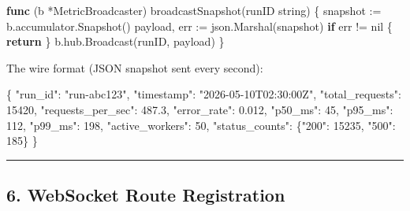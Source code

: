 \documentclass[
]{article}
\newenvironment{Shaded}{}{}
\newcommand{\ControlFlowTok}[1]{\textcolor[rgb]{0.00,0.44,0.13}{\textbf{#1}}}
\newcommand{\DataTypeTok}[1]{\textcolor[rgb]{0.56,0.13,0.00}{#1}}
\newcommand{\DecValTok}[1]{\textcolor[rgb]{0.25,0.63,0.44}{#1}}
\newcommand{\FloatTok}[1]{\textcolor[rgb]{0.25,0.63,0.44}{#1}}
\newcommand{\FunctionTok}[1]{\textcolor[rgb]{0.02,0.16,0.49}{#1}}
\newcommand{\KeywordTok}[1]{\textcolor[rgb]{0.00,0.44,0.13}{\textbf{#1}}}
\newcommand{\NormalTok}[1]{#1}
\newcommand{\OperatorTok}[1]{\textcolor[rgb]{0.40,0.40,0.40}{#1}}
\newcommand{\OtherTok}[1]{\textcolor[rgb]{0.00,0.44,0.13}{#1}}
\newcommand{\StringTok}[1]{\textcolor[rgb]{0.25,0.44,0.63}{#1}}
\begin{document}
\begin{Shaded}
\begin{Highlighting}[]
\KeywordTok{func} \OperatorTok{(}\NormalTok{b }\OperatorTok{*}\NormalTok{MetricBroadcaster}\OperatorTok{)}\NormalTok{ broadcastSnapshot}\OperatorTok{(}\NormalTok{runID }\DataTypeTok{string}\OperatorTok{)} \OperatorTok{\{}
\NormalTok{    snapshot }\OperatorTok{:=}\NormalTok{ b}\OperatorTok{.}\NormalTok{accumulator}\OperatorTok{.}\NormalTok{Snapshot}\OperatorTok{()}
\NormalTok{    payload}\OperatorTok{,}\NormalTok{ err }\OperatorTok{:=}\NormalTok{ json}\OperatorTok{.}\NormalTok{Marshal}\OperatorTok{(}\NormalTok{snapshot}\OperatorTok{)}
    \ControlFlowTok{if}\NormalTok{ err }\OperatorTok{!=} \OtherTok{nil} \OperatorTok{\{}
        \ControlFlowTok{return}
    \OperatorTok{\}}
\NormalTok{    b}\OperatorTok{.}\NormalTok{hub}\OperatorTok{.}\NormalTok{Broadcast}\OperatorTok{(}\NormalTok{runID}\OperatorTok{,}\NormalTok{ payload}\OperatorTok{)}
\OperatorTok{\}}
\end{Highlighting}
\end{Shaded}

The wire format (JSON snapshot sent every second):

\begin{Shaded}
\begin{Highlighting}[]
\FunctionTok{\{}
  \DataTypeTok{"run\_id"}\FunctionTok{:} \StringTok{"run{-}abc123"}\FunctionTok{,}
  \DataTypeTok{"timestamp"}\FunctionTok{:} \StringTok{"2026{-}05{-}10T02:30:00Z"}\FunctionTok{,}
  \DataTypeTok{"total\_requests"}\FunctionTok{:} \DecValTok{15420}\FunctionTok{,}
  \DataTypeTok{"requests\_per\_sec"}\FunctionTok{:} \FloatTok{487.3}\FunctionTok{,}
  \DataTypeTok{"error\_rate"}\FunctionTok{:} \FloatTok{0.012}\FunctionTok{,}
  \DataTypeTok{"p50\_ms"}\FunctionTok{:} \DecValTok{45}\FunctionTok{,}
  \DataTypeTok{"p95\_ms"}\FunctionTok{:} \DecValTok{112}\FunctionTok{,}
  \DataTypeTok{"p99\_ms"}\FunctionTok{:} \DecValTok{198}\FunctionTok{,}
  \DataTypeTok{"active\_workers"}\FunctionTok{:} \DecValTok{50}\FunctionTok{,}
  \DataTypeTok{"status\_counts"}\FunctionTok{:} \FunctionTok{\{}\DataTypeTok{"200"}\FunctionTok{:} \DecValTok{15235}\FunctionTok{,} \DataTypeTok{"500"}\FunctionTok{:} \DecValTok{185}\FunctionTok{\}}
\FunctionTok{\}}
\end{Highlighting}
\end{Shaded}

\begin{center}\rule{0.5\linewidth}{0.5pt}\end{center}

\hypertarget{websocket-route-registration}{%
\subsection{6. WebSocket Route
Registration}\label{websocket-route-registration}}
\end{document}
